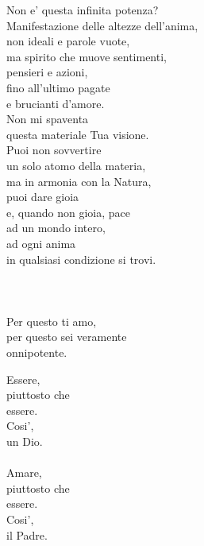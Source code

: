 \begin{haiku}
Non e' questa infinita potenza?\\
Manifestazione delle altezze dell'anima,\\
non ideali e parole vuote,\\
ma spirito che muove sentimenti, \\
pensieri e azioni,\\
fino all'ultimo pagate\\
e brucianti d'amore.\\
Non mi spaventa \\
    questa materiale Tua visione.\\
Puoi non sovvertire \\
    un solo atomo della materia,\\
ma in armonia con la Natura,\\
    puoi dare gioia \\
    e, quando non gioia, pace\\
ad un mondo intero, \\
    ad ogni anima\\
in qualsiasi condizione si trovi.\\
\leavevmode\\
\leavevmode\\
\leavevmode\\
Per questo ti amo,\\
per questo sei veramente \\
    onnipotente.\\
\end{haiku}

\begin{haiku}
    Essere,\\
    piuttosto che\\
    essere.\\
    Cosi',\\
    un Dio.\\
    \leavevmode\\
    Amare,\\
    piuttosto che\\
    essere.\\
    Cosi',\\
    il Padre.\\

\end{haiku}

